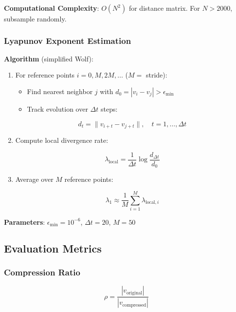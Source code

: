 \documentclass[11pt,a4paper]{article}
\begin{document}
\textbf{Computational Complexity}: $O(N^2)$ for distance matrix. For $N > 2000$, subsample randomly.

\subsubsection{Lyapunov Exponent Estimation}

\textbf{Algorithm} (simplified Wolf):

\begin{enumerate}
\item For reference points $i = 0, M, 2M, \ldots$ ($M =$ stride):
   \begin{itemize}
   \item Find nearest neighbor $j$ with $d_0 = |v_i - v_j| > \epsilon_{\min}$
   \item Track evolution over $\Delta t$ steps:
   \end{itemize}

\begin{equation}
d_t = \|v_{i+t} - v_{j+t}\|, \quad t = 1, \ldots, \Delta t
\end{equation}

\item Compute local divergence rate:

\begin{equation}
\lambda_{\text{local}} = \frac{1}{\Delta t} \log \frac{d_{\Delta t}}{d_0}
\end{equation}

\item Average over $M$ reference points:

\begin{equation}
\lambda_1 \approx \frac{1}{M} \sum_{i=1}^M \lambda_{\text{local},i}
\end{equation}
\end{enumerate}

\textbf{Parameters}: $\epsilon_{\min} = 10^{-6}$, $\Delta t = 20$, $M = 50$

\subsection{Evaluation Metrics}

\subsubsection{Compression Ratio}

\begin{equation}
\rho = \frac{|v_{\text{original}}|}{|v_{\text{compressed}}|}
\end{equation}
\end{document}
